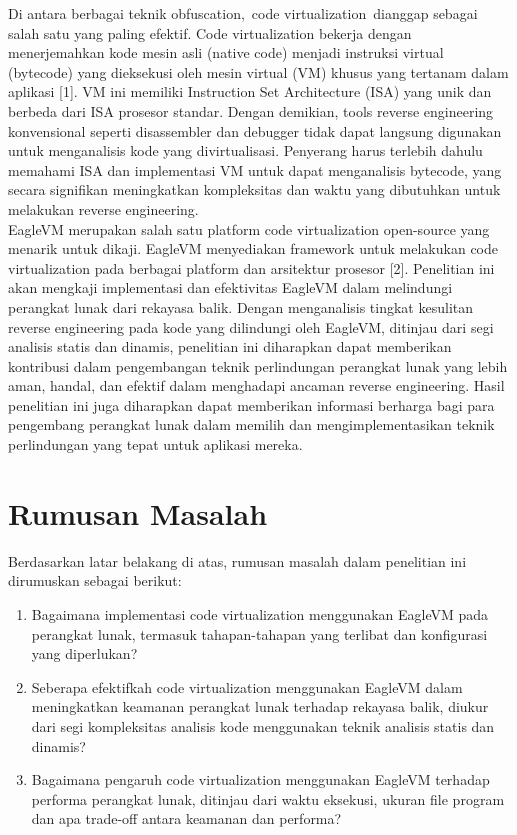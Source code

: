 Di antara berbagai teknik obfuscation, code virtualization dianggap sebagai salah satu yang paling efektif. Code virtualization bekerja dengan menerjemahkan kode mesin asli (native code) menjadi instruksi virtual (bytecode) yang dieksekusi oleh mesin virtual (VM) khusus yang tertanam dalam aplikasi [1]. VM ini memiliki Instruction Set Architecture (ISA) yang unik dan berbeda dari ISA prosesor standar. Dengan demikian, tools reverse engineering konvensional seperti disassembler dan debugger tidak dapat langsung digunakan untuk menganalisis kode yang divirtualisasi. Penyerang harus terlebih dahulu memahami ISA dan implementasi VM untuk dapat menganalisis bytecode, yang secara signifikan meningkatkan kompleksitas dan waktu yang dibutuhkan untuk melakukan reverse engineering. \\

EagleVM merupakan salah satu platform code virtualization open-source yang menarik untuk dikaji. EagleVM menyediakan framework untuk melakukan code virtualization pada berbagai platform dan arsitektur prosesor [2]. Penelitian ini akan mengkaji implementasi dan efektivitas EagleVM dalam melindungi perangkat lunak dari rekayasa balik. Dengan menganalisis tingkat kesulitan reverse engineering pada kode yang dilindungi oleh EagleVM, ditinjau dari segi analisis statis dan dinamis, penelitian ini diharapkan dapat memberikan kontribusi dalam pengembangan teknik perlindungan perangkat lunak yang lebih aman, handal, dan efektif dalam menghadapi ancaman reverse engineering. Hasil penelitian ini juga diharapkan dapat memberikan informasi berharga bagi para pengembang perangkat lunak dalam memilih dan mengimplementasikan teknik perlindungan yang tepat untuk aplikasi mereka.
\section{Rumusan Masalah}
Berdasarkan latar belakang di atas, rumusan masalah dalam penelitian ini dirumuskan sebagai berikut:
\begin{enumerate}
	\item Bagaimana implementasi code virtualization menggunakan EagleVM pada perangkat lunak, termasuk tahapan-tahapan yang terlibat dan konfigurasi yang diperlukan?
	\item Seberapa efektifkah code virtualization menggunakan EagleVM dalam meningkatkan keamanan perangkat lunak terhadap rekayasa balik, diukur dari segi kompleksitas analisis kode menggunakan teknik analisis statis dan dinamis?

	\item Bagaimana pengaruh code virtualization menggunakan EagleVM terhadap performa perangkat lunak, ditinjau dari waktu eksekusi, ukuran file program dan apa trade-off antara keamanan dan performa?

\end{enumerate}


